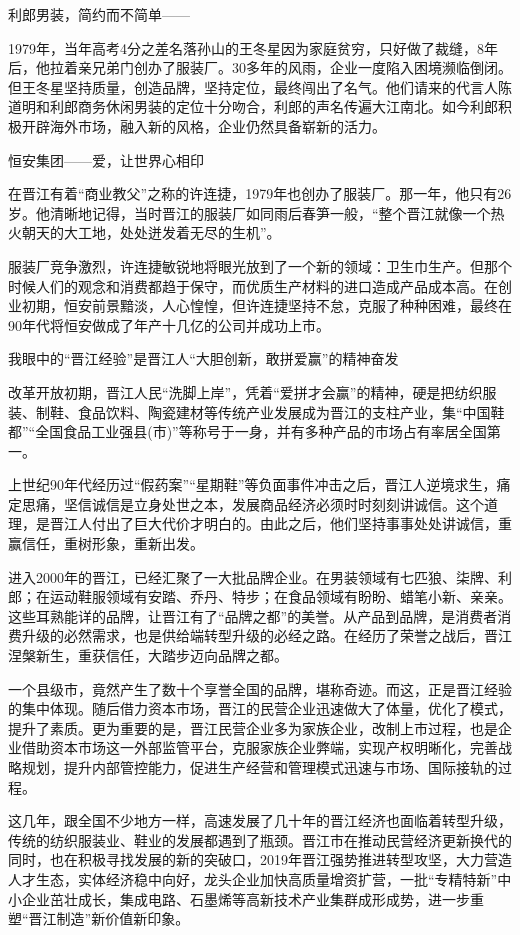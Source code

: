 \documentclass[
]{book}
\begin{document}
利郎男装，简约而不简单------

1979年，当年高考4分之差名落孙山的王冬星因为家庭贫穷，只好做了裁缝，8年后，他拉着亲兄弟门创办了服装厂。30多年的风雨，企业一度陷入困境濒临倒闭。但王冬星坚持质量，创造品牌，坚持定位，最终闯出了名气。他们请来的代言人陈道明和利郎商务休闲男装的定位十分吻合，利郎的声名传遍大江南北。如今利郎积极开辟海外市场，融入新的风格，企业仍然具备崭新的活力。

恒安集团------爱，让世界心相印

在晋江有着``商业教父''之称的许连捷，1979年也创办了服装厂。那一年，他只有26岁。他清晰地记得，当时晋江的服装厂如同雨后春笋一般，``整个晋江就像一个热火朝天的大工地，处处迸发着无尽的生机''。

服装厂竞争激烈，许连捷敏锐地将眼光放到了一个新的领域：卫生巾生产。但那个时候人们的观念和消费都趋于保守，而优质生产材料的进口造成产品成本高。在创业初期，恒安前景黯淡，人心惶惶，但许连捷坚持不怠，克服了种种困难，最终在90年代将恒安做成了年产十几亿的公司并成功上市。

我眼中的``晋江经验''是晋江人``大胆创新，敢拼爱赢''的精神奋发

改革开放初期，晋江人民``洗脚上岸''，凭着``爱拼才会赢''的精神，硬是把纺织服装、制鞋、食品饮料、陶瓷建材等传统产业发展成为晋江的支柱产业，集``中国鞋都''``全国食品工业强县(市)''等称号于一身，并有多种产品的市场占有率居全国第一。

上世纪90年代经历过``假药案''``星期鞋''等负面事件冲击之后，晋江人逆境求生，痛定思痛，坚信诚信是立身处世之本，发展商品经济必须时时刻刻讲诚信。这个道理，是晋江人付出了巨大代价才明白的。由此之后，他们坚持事事处处讲诚信，重赢信任，重树形象，重新出发。

进入2000年的晋江，已经汇聚了一大批品牌企业。在男装领域有七匹狼、柒牌、利郎；在运动鞋服领域有安踏、乔丹、特步；在食品领域有盼盼、蜡笔小新、亲亲。这些耳熟能详的品牌，让晋江有了``品牌之都''的美誉。从产品到品牌，是消费者消费升级的必然需求，也是供给端转型升级的必经之路。在经历了荣誉之战后，晋江涅槃新生，重获信任，大踏步迈向品牌之都。

一个县级市，竟然产生了数十个享誉全国的品牌，堪称奇迹。而这，正是晋江经验的集中体现。随后借力资本市场，晋江的民营企业迅速做大了体量，优化了模式，提升了素质。更为重要的是，晋江民营企业多为家族企业，改制上市过程，也是企业借助资本市场这一外部监管平台，克服家族企业弊端，实现产权明晰化，完善战略规划，提升内部管控能力，促进生产经营和管理模式迅速与市场、国际接轨的过程。

这几年，跟全国不少地方一样，高速发展了几十年的晋江经济也面临着转型升级，传统的纺织服装业、鞋业的发展都遇到了瓶颈。晋江市在推动民营经济更新换代的同时，也在积极寻找发展的新的突破口，2019年晋江强势推进转型攻坚，大力营造人才生态，实体经济稳中向好，龙头企业加快高质量增资扩营，一批``专精特新''中小企业茁壮成长，集成电路、石墨烯等高新技术产业集群成形成势，进一步重塑``晋江制造''新价值新印象。
\end{document}
